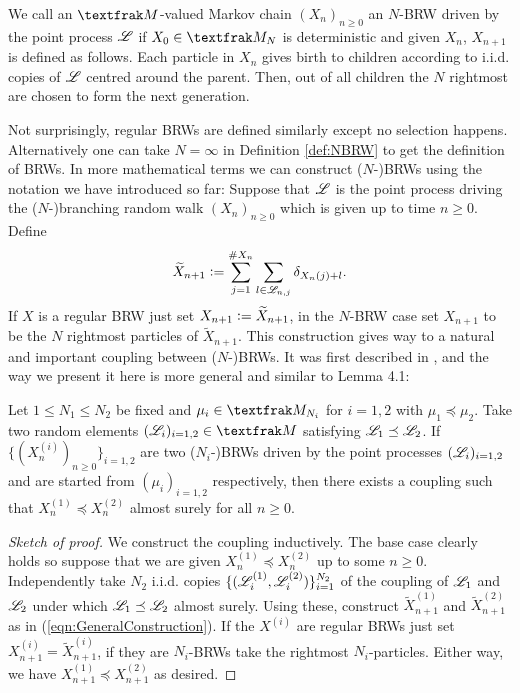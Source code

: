 \begin{definition}[$N$-BRW]\label{def:NBRW}
We call an $\frak{M}$-valued Markov chain $(X_n)_{n \geq 0}$ an $N$-BRW driven by the point process $\mathscr{L}$ if $X_0 \in \frak{M}_N$ is deterministic and given $X_n$, $X_{n+1}$ is defined as follows. Each particle in $X_n$ gives birth to children according to i.i.d. copies of $\mathscr{L}$ centred around the parent. Then, out of all children the $N$ rightmost are chosen to form the next generation. 
\end{definition}

Not surprisingly, regular BRWs are defined similarly except no selection happens. Alternatively one can take $N = \infty$ in Definition \ref{def:NBRW} to get the definition of BRWs. In more mathematical terms we can construct ($N$-)BRWs using the notation we have introduced so far: Suppose that $\mathscr{L}$ is the point process driving the ($N$-)branching random walk $(X_n)_{n\geq0}$ which is given up to time $n\geq0$. Define 
\begin{equation}\label{eqn:GeneralConstruction}
\widetilde{X}_{n+1} \vcentcolon= \sum\limits^{\# X_n}_{j=1} \sum\limits_{l \in \mathscr{L}_{n, j}} \delta_{X_n(j) +  l}. 
\end{equation}
If $X$ is a regular BRW just set $X_{n+1} \vcentcolon= \widetilde{X}_{n+1}$, in the $N$-BRW case set $X_{n+1}$ to be the $N$ rightmost particles of $\widetilde{X}_{n+1}$. This construction gives way to a natural and important coupling between ($N$-)BRWs. It was first described in \cite{exp_tails}, and the way we present it here is more general and similar to \cite{mallein2018n} Lemma 4.1:

\begin{lemma}\label{lem:monotonicity}
Let $1 \leq N_1 \leq N_2$ be fixed and $\mu_i \in \frak{M}_{N_i}$ for $i=1,2$ with $\mu_1 \preceq \mu_2$. Take two random elements $(\scr{L}_i)_{i =1,2} \in \frak{M}$ satisfying $\mathscr{L}_1 \preceq \mathscr{L}_2$. If $\{(X^{(i)}_n)_{n\geq0}\}_{i=1,2}$ are two ($N_i$-)BRWs driven by the point processes $(\mathscr{L}_i)_{i = 1,2}$ and are started from $(\mu_i)_{i = 1,2}$ respectively, then there exists a coupling such that $X^{(1)}_n \preceq X^{(2)}_n$ almost surely for all $n \geq 0$. 
\end{lemma}

\begin{proof}[Sketch of proof]
We construct the coupling inductively. The base case clearly holds so suppose that we are given $X^{(1)}_n \preceq X^{(2)}_n$ up to some $n \geq 0$. Independently take $N_2$ i.i.d. copies $\{(\mathscr{L}^{(1)}_i, \mathscr{L}^{(2)}_i)\}^{N_2}_{i=1}$ of the coupling of $\mathscr{L}_1$ and $\mathscr{L}_2$ under which $\mathscr{L}_1 \preceq \mathscr{L}_2$ almost surely. Using these, construct $\widetilde{X}^{(1)}_{n+1}$ and $\widetilde{X}^{(2)}_{n+1}$ as in (\ref{eqn:GeneralConstruction}). If the $X^{(i)}$ are regular BRWs just set $X^{(i)}_{n+1} = \widetilde{X}^{(i)}_{n+1}$, if they are $N_i$-BRWs take the rightmost $N_i$-particles. Either way, we have $X^{(1)}_{n+1} \preceq X^{(2)}_{n+1}$ as desired. 
\end{proof}	


